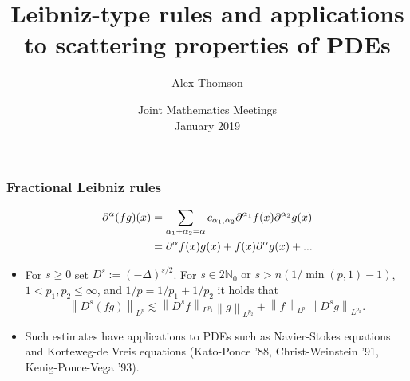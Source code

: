 \documentclass[xcolor=dvipsnames]{beamer}
\title[Leibniz-type rules]{Leibniz-type rules and applications to scattering
properties of PDEs}
\author[Alex Thomson]{Alex Thomson}
\institute[Kansas State University]{
Department of Mathematics \\
Kansas State University
 }
\date[January 2019]{Joint Mathematics Meetings\\ January 2019}
\newcommand{\na}{\mathbb{N}}
\newcommand{\fr}[2]{{\textstyle \frac{#1}{#2}}}
\newcommand{\norm}[2]{{\left\| #1 \right\|}_{#2}}
\newcommand{\hcline}{1/p=1/p_1+1/p_2}
\begin{document}
\begin{frame}[plain]
  \titlepage
\end{frame}


\begin{frame}\frametitle{Fractional Leibniz rules}
\begin{align*}
\partial^\alpha(fg)(x) & = \sum_{\alpha_1 + \alpha_2 = \alpha} c_{\alpha_1,\alpha_2} \partial^{\alpha_1} f(x) \partial^{\alpha_2} g(x)\\ \medskip
& =\partial^\alpha f(x) g(x) + f(x) \partial^\alpha g(x) + ...
\end{align*}
\medskip
\begin{itemize}
\item  For $s \ge 0$ set $D^s:=(-\Delta)^{s/2}$. For $s\in 2\na_0 \text{ or } s>n({1}/{\min(p,1)}-1)$, $1<p_1,p_2\le \infty$, and $\hcline$  it holds that 
\[
   \norm{D^s(fg)}{L^p} \lesssim  \norm{D^sf}{L^{p_1}} \norm{g}{L^{p_2}}+ \norm{f}{L^{p_1}} \norm{D^sg}{L^{p_2}}.
\]
\medskip
\item Such estimates have applications to PDEs such as Navier-Stokes equations and Korteweg-de Vreis equations (Kato-Ponce '88, Christ-Weinstein '91, Kenig-Ponce-Vega '93).
\end{itemize}

\end{frame}


%
\end{document}
